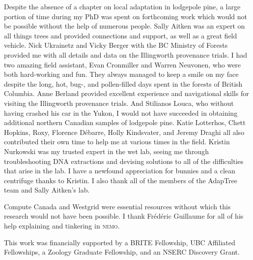 Despite the absence of a chapter on local adaptation in lodgepole pine, a large portion of time during my PhD was spent on forthcoming work which would not be possible without the help of numerous people. Sally Aitken was an expert on all things trees and provided connections and support, as well as a great field vehicle. Nick Ukrainetz and Vicky Berger with the BC Ministry of Forests provided me with all details and data on the Illingworth provenance trials. I had two amazing field assistant, Evan Cronmiller and Warren Neuvonen, who were both hard-working and fun. They always managed to keep a smile on my face despite the long, hot, bug-, and pollen-filled days spent in the forests of British Columbia. Anne Berland provided excellent experience and navigational skills for visiting the Illingworth provenance trials. And Stilianos Louca, who without having crashed his car in the Yukon, I would not have succeeded in obtaining additional northern Canadian samples of lodgepole pine. Katie Lotterhos, Chett Hopkins, Roxy, Florence D\'ebarre, Holly Kindsvater, and Jeremy Draghi all also contributed their own time to help me at various times in the field. Kristin Nurkowski was my trusted expert in the wet lab, seeing me through troubleshooting DNA extractions and devising solutions to all of the difficulties that arise in the lab. I have a newfound appreciation for bunnies and a clean centrifuge thanks to Kristin. I also thank all of the members of the AdapTree team and Sally Aitken's lab.

Compute Canada and Westgrid were essential resources without which this research would not have been possible. I thank Fr\'ed\'eric Guillaume for all of his help explaining and tinkering in \textsc{nemo}.

This work was financially supported by a BRITE Fellowship, UBC Affiliated Fellowships, a Zoology Graduate Fellowship, and an NSERC Discovery Grant. 
